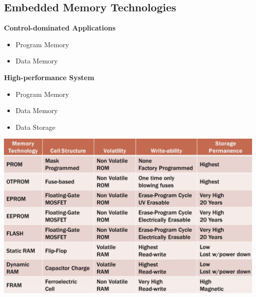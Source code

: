 \subsection{Embedded Memory Technologies }
\begin{minipage}{0.5\linewidth}
   \textbf{Control-dominated Applications}
       \begin{itemize}
       \item Program Memory
       \item Data Memory
   \end{itemize}
    \textbf{High-performance System}
\begin{itemize}
    \item Program Memory
    \item Data Memory
    \item Data Storage
\end{itemize}
\end{minipage}
\begin{minipage}{0.5\linewidth}
    \includegraphics[width=\linewidth]{images/MemoryTech}
\end{minipage}
\clearpage
\pagebreak